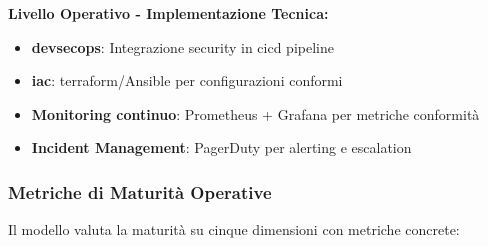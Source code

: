 \textbf{Livello Operativo - Implementazione Tecnica:}
\begin{itemize}
    \item \textbf{\gls{devsecops}}: Integrazione security in \gls{cicd} pipeline
    \item \textbf{\gls{iac}}: \gls{terraform}/Ansible per configurazioni conformi
    \item \textbf{Monitoring continuo}: Prometheus + Grafana per metriche conformità
    \item \textbf{Incident Management}: PagerDuty per alerting e escalation
\end{itemize}

\subsubsection{\texorpdfstring{Metriche di Maturità Operative}{4.4.1.2 - Metriche di Maturità Operative}}

Il modello valuta la maturità su cinque dimensioni con metriche concrete:

